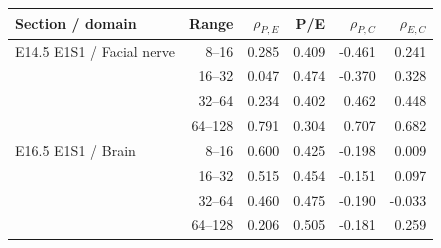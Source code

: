 \begin{tabular}{lrrrrr}
\toprule
Section / domain & Range & $\rho_{P,E}$ & P/E & $\rho_{P,C}$ & $\rho_{E,C}$ \\
\midrule
E14.5 E1S1 / Facial nerve & 8--16 & 0.285 & 0.409 & -0.461 & 0.241 \\
 & 16--32 & 0.047 & 0.474 & -0.370 & 0.328 \\
 & 32--64 & 0.234 & 0.402 & 0.462 & 0.448 \\
 & 64--128 & 0.791 & 0.304 & 0.707 & 0.682 \\
E16.5 E1S1 / Brain & 8--16 & 0.600 & 0.425 & -0.198 & 0.009 \\
 & 16--32 & 0.515 & 0.454 & -0.151 & 0.097 \\
 & 32--64 & 0.460 & 0.475 & -0.190 & -0.033 \\
 & 64--128 & 0.206 & 0.505 & -0.181 & 0.259 \\
\bottomrule
\end{tabular}
